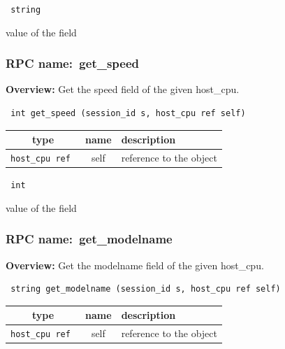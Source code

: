 {\tt 
string
}


value of the field
\vspace{0.3cm}
\vspace{0.3cm}
\vspace{0.3cm}
\subsubsection{RPC name:~get\_speed}

{\bf Overview:} 
Get the speed field of the given host\_cpu.

\begin{verbatim} int get_speed (session_id s, host_cpu ref self)\end{verbatim}



 
\vspace{0.3cm}
\begin{tabular}{|c|c|p{7cm}|}
 \hline
{\bf type} & {\bf name} & {\bf description} \\ \hline
{\tt host\_cpu ref } & self & reference to the object \\ \hline 

\end{tabular}

\vspace{0.3cm}

{\tt 
int
}


value of the field
\vspace{0.3cm}
\vspace{0.3cm}
\vspace{0.3cm}
\subsubsection{RPC name:~get\_modelname}

{\bf Overview:} 
Get the modelname field of the given host\_cpu.

\begin{verbatim} string get_modelname (session_id s, host_cpu ref self)\end{verbatim}



 
\vspace{0.3cm}
\begin{tabular}{|c|c|p{7cm}|}
 \hline
{\bf type} & {\bf name} & {\bf description} \\ \hline
{\tt host\_cpu ref } & self & reference to the object \\ \hline 

\end{tabular}

